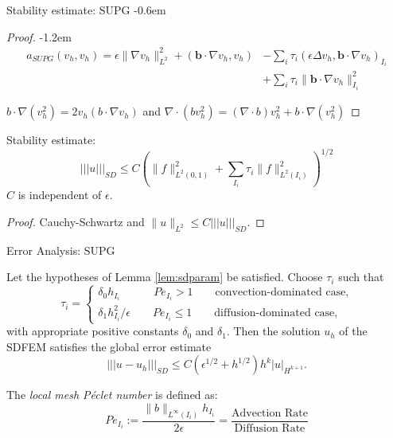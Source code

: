 \documentclass{beamer}
\newcommand{\eps}{\epsilon}
\begin{document}
\begin{frame}{Stability estimate: SUPG}
\kern-0.6em
\begin{proof}
\kern-1.2em
    \begin{align*}
        a_{SUPG}(v_h, v_h) = \epsilon \|\nabla v_h\|^2_{L^2} + (\textbf{b} \cdot \nabla v_h, v_h) &- \sum_{i} \tau_i (\eps\Delta v_h, \textbf{b} \cdot \nabla v_h)_{I_i}  \\ &+ \sum_{i} \tau_i \|\textbf{b} \cdot \nabla v_h\|_{I_i}^2
    \end{align*}

$b \cdot \nabla(v_h^2) = 2v_h(b \cdot \nabla v_h)$ and $\nabla \cdot (bv_h^2) = (\nabla \cdot b)v_h^2 + b \cdot \nabla(v_h^2)$
\end{proof}
\pause
Stability estimate:
$$ \boxed{|||u|||_{SD} \leq C\left( \|f\|_{L^2(0,1)}^2 + \sum_{I_i} \tau_i \|f\|^2_{L^2(I_i)}\right)^{1/2}}$$
$C$ is independent of $\eps$.
\pause
\begin{proof}
    Cauchy-Schwartz and $\|u\|_{L^2} \leq C|||u|||_{SD}$.
\end{proof}
    
\end{frame}

\begin{frame}{Error Analysis: SUPG}
\begin{theorem}[1]
    Let the hypotheses of Lemma \ref{lem:sdparam} be satisfied. Choose $\tau_i$ such that
    $$\tau_i = \begin{cases}
        \delta_0 h_{I_i} \qquad \quad Pe_{I_i} > 1 \qquad \text{convection-dominated case,} \\
        \delta_1 h_{I_i}^2/\eps \qquad Pe_{I_i} \leq 1 \qquad \text{diffusion-dominated case,}
    \end{cases}$$
    with appropriate positive constants $\delta_0$ and $\delta_1$. Then the solution $u_h$ of the SDFEM satisfies the global error estimate
    $$ |||u - u_h|||_{SD} \leq C(\eps^{1/2} + h^{1/2})h^k |u|_{H^{k+1}}.$$
\end{theorem}
The \textit{local mesh P\'eclet number} is defined as:
$$Pe_{I_i} := \frac{\|b\|_{L^\infty(I_i)} h_{I_i}}{2\epsilon} = \frac{\text{Advection Rate}}{\text{Diffusion Rate}}$$
    
\end{frame}
\end{document}
